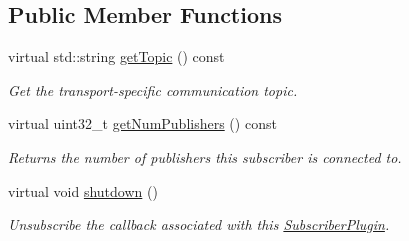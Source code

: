 \subsection*{Public Member Functions}
\begin{DoxyCompactItemize}
\item 
\hypertarget{classimage__transport_1_1_simple_subscriber_plugin_ab6e2fa57778770429195a516b78dcb1a}{virtual std\-::string \hyperlink{classimage__transport_1_1_simple_subscriber_plugin_ab6e2fa57778770429195a516b78dcb1a}{get\-Topic} () const }\label{classimage__transport_1_1_simple_subscriber_plugin_ab6e2fa57778770429195a516b78dcb1a}

\begin{DoxyCompactList}\small\item\em Get the transport-\/specific communication topic. \end{DoxyCompactList}\item 
\hypertarget{classimage__transport_1_1_simple_subscriber_plugin_ae7115a373237561c9896fa93d74fe981}{virtual uint32\-\_\-t \hyperlink{classimage__transport_1_1_simple_subscriber_plugin_ae7115a373237561c9896fa93d74fe981}{get\-Num\-Publishers} () const }\label{classimage__transport_1_1_simple_subscriber_plugin_ae7115a373237561c9896fa93d74fe981}

\begin{DoxyCompactList}\small\item\em Returns the number of publishers this subscriber is connected to. \end{DoxyCompactList}\item 
\hypertarget{classimage__transport_1_1_simple_subscriber_plugin_a559eb7593e56faf92fbfba771e317455}{virtual void \hyperlink{classimage__transport_1_1_simple_subscriber_plugin_a559eb7593e56faf92fbfba771e317455}{shutdown} ()}\label{classimage__transport_1_1_simple_subscriber_plugin_a559eb7593e56faf92fbfba771e317455}

\begin{DoxyCompactList}\small\item\em Unsubscribe the callback associated with this \hyperlink{classimage__transport_1_1_subscriber_plugin}{Subscriber\-Plugin}. \end{DoxyCompactList}\end{DoxyCompactItemize}
